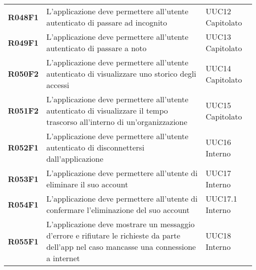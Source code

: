 \documentclass[../analisi-dei-requisiti.tex]{subfiles}
\begin{document}
\begin{longtable}[H]{>{\centering\bfseries}m{3cm} >{\centering}m{10cm} >{\centering\arraybackslash}m{3cm}}
  R048F1                               & L'applicazione deve permettere all'utente autenticato di passare ad incognito                                                                                                                           & UUC12 Capitolato            \\
  R049F1                               & L'applicazione deve permettere all'utente autenticato di passare a noto                                                                                                                                 & UUC13 Capitolato            \\
  R050F2                               & L'applicazione deve permettere all'utente autenticato di visualizzare uno storico degli accessi                                                                                                         & UUC14 Capitolato              \\
  R051F2                               & L'applicazione deve permettere all'utente autenticato di visualizzare il tempo trascorso all'interno di un'organizzazione                                                                               & UUC15 Capitolato              \\
  R052F1                               & L'applicazione deve permettere all'utente autenticato di disconnettersi dall'applicazione                                                                                                               & UUC16 Interno                 \\
  R053F1                               & L'applicazione deve permettere all'utente di eliminare il suo account                                                                                                                                   & UUC17 Interno                 \\
  R054F1                               & L'applicazione deve permettere all'utente di confermare l'eliminazione del suo account                                                                                                                  & UUC17.1 Interno               \\
  R055F1                               & L'applicazione deve mostrare un messaggio d'errore e rifiutare le richieste da parte dell'app nel caso mancasse una connessione a internet                                                              & UUC18 Interno                 \\


\end{longtable}
\end{document}
